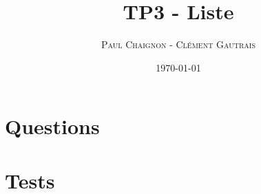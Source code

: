 \documentclass[a4paper,12pt]{article}
\title{TP3 - Liste}
\author{\textsc{Paul Chaignon} - \textsc{Clément Gautrais}}
\date{\today}
\begin{document}
\maketitle

\section{Questions}


\vspace{1cm}

\section{Tests}


\vspace{0.5cm}
\end{document}

